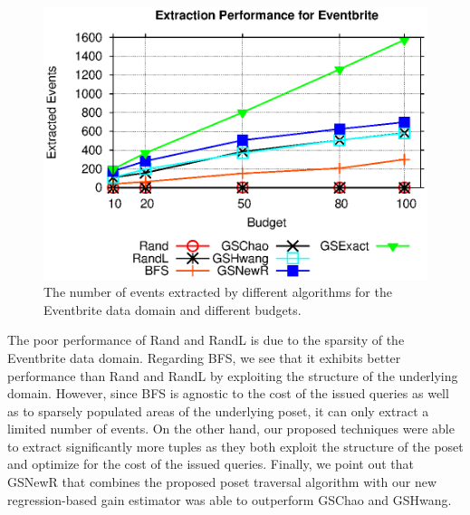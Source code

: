 \begin{figure}[h]
	\begin{center}
	\includegraphics[clip,scale=0.5]{figs/ebExtractionAll.eps}
	\caption{The number of events extracted by different algorithms for the Eventbrite data domain and different budgets.}
	\label{fig:ebextraction}
	\end{center}
	\vspace{-20pt}
\end{figure}


The poor performance of Rand and RandL is due to the sparsity of the Eventbrite data domain. Regarding BFS, we see that it exhibits better performance than Rand and RandL by exploiting the structure of the underlying domain. However, since BFS is agnostic to the cost of the issued queries as well as to sparsely populated areas of the underlying poset, it can only extract a limited number of events. On the other hand, our proposed techniques were able to extract significantly more tuples as they both exploit the structure of the poset and optimize for the cost of the issued queries. Finally, we point out that GSNewR that combines the proposed poset traversal algorithm with our new regression-based gain estimator was able to outperform GSChao and GSHwang. 

